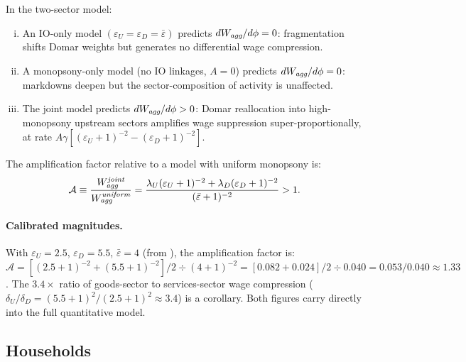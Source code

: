 \begin{proposition}\label{prop:toy}
  In the two-sector model:
  \begin{enumerate}[(i)]
    \item An IO-only model $(\varepsilon_U = \varepsilon_D = \bar\varepsilon)$
      predicts $dW_{\emph{agg}}/d\phi = 0$: fragmentation shifts Domar
      weights but generates no differential wage compression.
    \item A monopsony-only model (no IO linkages, $A = 0$) predicts
      $dW_{\emph{agg}}/d\phi = 0$: markdowns deepen but the
      sector-composition of activity is unaffected.
    \item The joint model predicts $dW_{\emph{agg}}/d\phi > 0$: Domar
      reallocation into high-monopsony upstream sectors amplifies wage
      suppression super-proportionally, at rate
      $A\gamma[(\varepsilon_U+1)^{-2} - (\varepsilon_D+1)^{-2}]$.
  \end{enumerate}
  The amplification factor relative to a model with uniform monopsony is:
  \begin{equation}
    \mathcal{A} \equiv \frac{W_{\emph{agg}}^{\emph{joint}}}
    {W_{\emph{agg}}^{\emph{uniform}}} =
    \frac{\lambda_U(\varepsilon_U+1)^{-2} + \lambda_D(\varepsilon_D+1)^{-2}}
    {(\bar\varepsilon+1)^{-2}} > 1.
    \label{eq:amp_factor}
  \end{equation}
\end{proposition}

\paragraph{Calibrated magnitudes.}
With $\varepsilon_U = 2.5$, $\varepsilon_D = 5.5$, $\bar\varepsilon = 4$
(from \citealt{dube2020monopsony}), the amplification factor is:
$\mathcal{A} = [(2.5+1)^{-2} + (5.5+1)^{-2}]/2 \div (4+1)^{-2} = [0.082
+ 0.024]/2 \div 0.040 = 0.053/0.040 \approx 1.33$. The $3.4\times$ ratio
of goods-sector to services-sector wage compression ($\delta_U/\delta_D
= (5.5+1)^2/(2.5+1)^2 \approx 3.4$) is a corollary. Both figures carry
directly into the full quantitative model.

\subsection{Households}
\label{sec:households}

